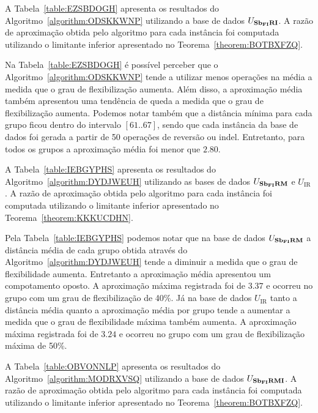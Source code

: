 A Tabela~\ref{table:EZSBDOGH} apresenta os resultados do Algoritmo~\ref{algorithm:ODSKKWNP} utilizando a base de dados $U_{\textbf{Sb\textsubscript{FI}RI}}{}$. A razão de aproximação obtida pelo algoritmo para cada instância foi computada utilizando o limitante inferior apresentado no Teorema~\ref{theorem:BOTBXFZQ}.



Na Tabela~\ref{table:EZSBDOGH} é possível perceber que o Algoritmo~\ref{algorithm:ODSKKWNP} tende a utilizar menos operações na média a medida que o grau de flexibilização aumenta. Além disso, a aproximação média também apresentou uma tendência de queda a medida que o grau de flexibilização aumenta. Podemos notar também que a distância mínima para cada grupo ficou dentro do intervalo $[61..67]$, sendo que cada instância da base de dados foi gerada a partir de 50 operações de reversão ou indel. Entretanto, para todos os grupos a aproximação média foi menor que $2.80$.

A Tabela~\ref{table:IEBGYPHS} apresenta os resultados do Algoritmo~\ref{algorithm:DYDJWEUH} utilizando as bases de dados $U_{\textbf{Sb\textsubscript{FI}RM}}{}$ e $U_{\text{IR}}$. A razão de aproximação obtida pelo algoritmo para cada instância foi computada utilizando o limitante inferior apresentado no Teorema~\ref{theorem:KKKUCDHN}.



% 

Pela Tabela~\ref{table:IEBGYPHS} podemos notar que na base de dados $U_{\textbf{Sb\textsubscript{FI}RM}}{}$ a distância média de cada grupo obtida através do Algoritmo~\ref{algorithm:DYDJWEUH} tende a diminuir a medida que o grau de flexibilidade aumenta. Entretanto a aproximação média apresentou um compotamento oposto. A aproximação máxima registrada foi de $3.37$ e ocorreu no grupo com um grau de flexibilização de 40\%. Já na base de dados $U_{\text{IR}}$ tanto a distância média quanto a aproximação média por grupo tende a aumentar a medida que o grau de flexibilidade máxima também aumenta. A aproximação máxima registrada foi de $3.24$ e ocorreu no grupo com um grau de flexibilização máxima de 50\%.

A Tabela~\ref{table:OBVONNLP} apresenta os resultados do Algoritmo~\ref{algorithm:MODRXVSQ} utilizando a base de dados $U_{\textbf{Sb\textsubscript{FI}RMI}}{}$. A razão de aproximação obtida pelo algoritmo para cada instância foi computada utilizando o limitante inferior apresentado no Teorema~\ref{theorem:BOTBXFZQ}.



